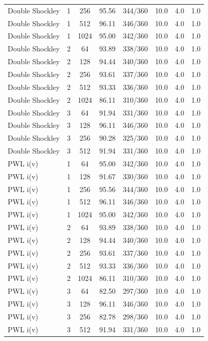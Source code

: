 \begin{landscape}
{\begin{longtable}{lccrrrcr}
Double Shockley & 1 & 256 & 95.56 & 344/360 & 10.0 & 4.0 & 1.0\\
Double Shockley & 1 & 512 & 96.11 & 346/360 & 10.0 & 4.0 & 1.0\\
Double Shockley & 1 & 1024 & 95.00 & 342/360 & 10.0 & 4.0 & 1.0\\
Double Shockley & 2 & 64 & 93.89 & 338/360 & 10.0 & 4.0 & 1.0\\
Double Shockley & 2 & 128 & 94.44 & 340/360 & 10.0 & 4.0 & 1.0\\
Double Shockley & 2 & 256 & 93.61 & 337/360 & 10.0 & 4.0 & 1.0\\
Double Shockley & 2 & 512 & 93.33 & 336/360 & 10.0 & 4.0 & 1.0\\
Double Shockley & 2 & 1024 & 86.11 & 310/360 & 10.0 & 4.0 & 1.0\\
Double Shockley & 3 & 64 & 91.94 & 331/360 & 10.0 & 4.0 & 1.0\\
Double Shockley & 3 & 128 & 96.11 & 346/360 & 10.0 & 4.0 & 1.0\\
Double Shockley & 3 & 256 & 90.28 & 325/360 & 10.0 & 4.0 & 1.0\\
Double Shockley & 3 & 512 & 91.94 & 331/360 & 10.0 & 4.0 & 1.0\\
\addlinespace
PWL i(v) & 1 & 64 & 95.00 & 342/360 & 10.0 & 4.0 & 1.0\\
PWL i(v) & 1 & 128 & 91.67 & 330/360 & 10.0 & 4.0 & 1.0\\
PWL i(v) & 1 & 256 & 95.56 & 344/360 & 10.0 & 4.0 & 1.0\\
PWL i(v) & 1 & 512 & 96.11 & 346/360 & 10.0 & 4.0 & 1.0\\
PWL i(v) & 1 & 1024 & 95.00 & 342/360 & 10.0 & 4.0 & 1.0\\
PWL i(v) & 2 & 64 & 93.89 & 338/360 & 10.0 & 4.0 & 1.0\\
PWL i(v) & 2 & 128 & 94.44 & 340/360 & 10.0 & 4.0 & 1.0\\
PWL i(v) & 2 & 256 & 93.61 & 337/360 & 10.0 & 4.0 & 1.0\\
PWL i(v) & 2 & 512 & 93.33 & 336/360 & 10.0 & 4.0 & 1.0\\
PWL i(v) & 2 & 1024 & 86.11 & 310/360 & 10.0 & 4.0 & 1.0\\
PWL i(v) & 3 & 64 & 82.50 & 297/360 & 10.0 & 4.0 & 1.0\\
PWL i(v) & 3 & 128 & 96.11 & 346/360 & 10.0 & 4.0 & 1.0\\
PWL i(v) & 3 & 256 & 82.78 & 298/360 & 10.0 & 4.0 & 1.0\\
PWL i(v) & 3 & 512 & 91.94 & 331/360 & 10.0 & 4.0 & 1.0\\
\end{longtable}
}
\end{landscape}
